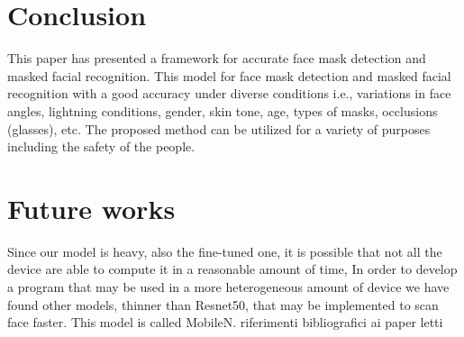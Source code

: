 \section{Conclusion} 

This paper has presented a framework for accurate face mask detection and masked facial recognition.
This model for face mask detection and masked facial recognition with a good accuracy under diverse conditions i.e., variations in face angles,
lightning conditions, gender, skin tone, age, types of masks, occlusions (glasses), etc. 
The proposed method can be utilized for a variety of purposes including the safety of the people. 

\section{Future works}
Since our model is heavy, also the fine-tuned one, it is possible that not all the device are able to compute it in a reasonable amount of time, In order to develop a program that may be used in a more heterogeneous amount of device we have found other models, thinner than Resnet50, that may be implemented to scan face faster. This model is called MobileN.
riferimenti bibliografici ai paper letti
